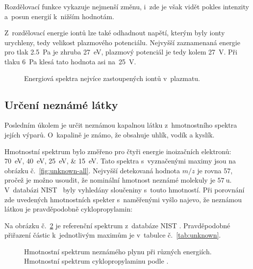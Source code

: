 \documentclass{protokol}
\newcommand\mz{m/z}
\begin{document}
Rozdělovací funkce  vykazuje nejmenší změnu,
i~zde je však vidět pokles intenzity a~posun energií k~nižším hodnotám.

Z~rozdělovací energie iontů lze také odhadnout napětí, kterým byly ionty
urychleny, tedy velikost plazmového potenciálu.
Nejvyšší zaznamenaná energie pro tlak \SI{2.5}{\pascal} je zhruba
\SI{27}{\electronvolt}, plazmový potenciál je tedy kolem \SI{27}{\volt}.
Při tlaku \SI{6}{\pascal} klesá tato hodnota asi na~\SI{25}{\volt}.

\begin{figure}[htp]
	\centering
	
	
	\caption{Energiová spektra nejvíce zastoupených iontů v~plazmatu.}
	\label{fig:energy}
\end{figure}

\subsection{Určení neznámé látky}
\label{sec:unknown}
Posledním úkolem je určit neznámou kapalnou látku z~hmotnostního spektra
jejích výparů.
O~kapalině je známo, že obsahuje uhlík, vodík a kyslík.

Hmotnostní spektrum bylo změřeno pro čtyři energie inoizačních elektronů:
\SIlist[list-separator={, }]{70;40;25;15}{\electronvolt}.
Tato spektra s~vyznačenými maximy jsou na obrázku č.~\ref{fig:unknown-all}.
Nejvyšší detekovaná hodnota $\mz$ je rovna \SI{57}{\thomson},
pročež je možno usoudit, že nominální hmotnost neznámé molekuly
je $\SI{57}{\amu}$.
V~databázi NIST~\parencite{nist} byly vyhledány sloučeniny s~touto hmotností.
Při porovnání zde uvedených hmotnostních spekter s~naměřenými vyšlo najevo,
že neznámou látkou je pravděpodobně cyklopropylamin:
\begin{center}
\end{center}

Na obrázku č.~\ref{fig:cyclopropylamine-nist} je referenční spektrum
z~databáze NIST \parencite{nist}.
Pravděpodobné přiřazení částic k~jednotlivým maximům je
v~tabulce č.~\ref{tab:unknown}.

\begin{figure}[htp]
	\centering
	
	
	\caption{Hmotnostní spektrum neznámého plynu při různých energiích.
		Hmotnostní spektrum cyklopropylaminu podle \cite{nist}.}
	\label{fig:unknown-all}
	\label{fig:cyclopropylamine-nist}
\end{figure}
\end{document}

